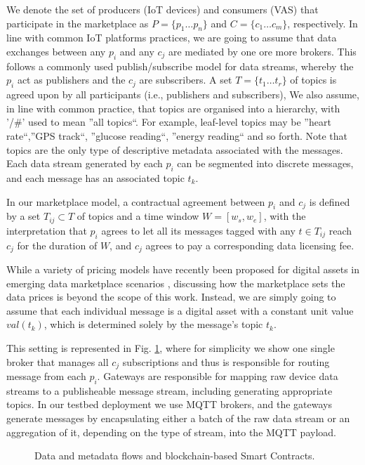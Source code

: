 \documentclass[conference]{IEEEtran}
\begin{document}
We denote the set of producers (IoT devices) and consumers (VAS) that participate in the marketplace as $P = \{p_1 \dots p_n \}$ and $C = \{ c_1 \dots c_m \}$, respectively.
	In line with common IoT platforms practices, we are going to assume that data exchanges between any $p_i$ and any $c_j$ are mediated by one ore more brokers. 
This follows a commonly used publish/subscribe model for data streams, whereby the $p_i$ act as publishers and the $c_j$ are subscribers.
A set $T = \{ t_1 \dots t_r \}$ of topics is agreed upon by all participants (i.e., publishers and subscribers), 
%
We also assume, in line with common practice, that topics are organised into a hierarchy, with '/\#' used to mean ''all topics``. 
For example, leaf-level topics may be ''heart rate``,''GPS track``, ''glucose reading``, ''energy reading`` and so forth. Note that topics are the only type of descriptive metadata associated with the messages. 
%
Each data stream generated by each $p_i$ can be segmented into discrete messages, and each message has an associated topic $t_k$.

In our marketplace model, a contractual agreement between $p_i$ and $c_j$ is defined by a set $T_{ij} \subset T$ of topics and a time window $ W = [w_s, w_e] $, with the interpretation that $p_i$ agrees to let all its messages tagged with any $t \in T_{ij}$ reach $c_j$ for the duration of $W$, and $c_j$ agrees to pay a corresponding data licensing fee. 

While a variety of pricing models have recently been proposed for digital assets in emerging data marketplace scenarios , discussing how the marketplace sets the data prices is beyond the scope of this work. 
Instead, we are simply going to assume that each individual message is a digital asset with a constant unit value $\mathit{val}(t_k)$, which is determined solely by the message's topic $t_k$.

This setting is represented in  Fig. \ref{fig:reference-architecture}, where for simplicity we show one single broker that manages all $c_j$ subscriptions and thus is responsible for routing message from each $p_i$.
%
Gateways are responsible for mapping raw device data streams to a publisheable message stream, including generating appropriate topics.
In our testbed deployment we use MQTT brokers, and the gateways generate messages by encapsulating either a batch of the raw data stream or an aggregation of it, depending on the type of stream, into the MQTT payload.


\begin{figure}
	\caption{Data and metadata flows and blockchain-based Smart Contracts.}
	\label{fig:reference-architecture}
\end{figure}
\end{document}
